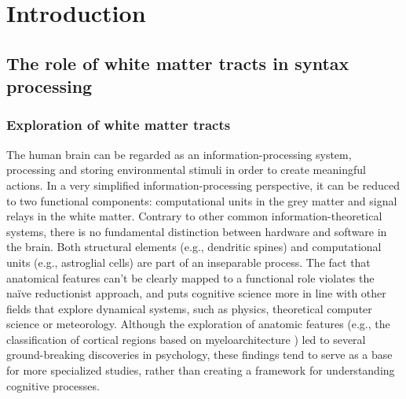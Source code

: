 \chapter{Introduction}

\section{The role of white matter tracts in syntax processing}

\subsection{Exploration of white matter tracts}
The human brain can be regarded as an information-processing system, processing and storing environmental stimuli in order to create meaningful actions. 
In a very simplified information-processing perspective, it can be reduced to two functional components: computational units in the grey matter and signal relays in the white matter.
Contrary to other common information-theoretical systems, there is no fundamental distinction between hardware and software in the brain.
Both structural elements (e.g., dendritic spines) and computational units (e.g., astroglial cells) are part of an inseparable process.
The fact that anatomical features can't be clearly mapped to a functional role violates the naïve reductionist approach, and puts cognitive science more in line with other fields that explore dynamical systems, such as physics, theoretical computer science or meteorology.
Although the exploration of anatomic features (e.g., the classification of cortical regions based on myeloarchitecture ) led to several ground-breaking discoveries in psychology, these findings tend to serve as a base for more specialized studies, rather than creating a framework for understanding cognitive processes.

